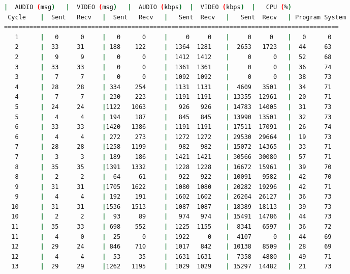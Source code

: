 \begin{adjustbox}{max width=\textwidth}
\begin{lstlisting}[language=bash,basicstyle=\ttfamily\scriptsize]
          |  AUDIO (msg)   |  VIDEO (msg)   |  AUDIO (kbps)  |  VIDEO (kbps)  |   CPU (%)
 Cycle    |  Sent   Recv   |  Sent   Recv   |   Sent  Recv   |   Sent  Recv   | Program System
============================================================================================
   1      |   0      0     |   0      0     |     0     0    |     0     0    |   0      0
   2      |  33     31     | 188    122     |  1364  1281    |  2653   1723   |  44     63
   2      |   9      9     |   0      0     |  1412  1412    |     0      0   |  52     68
   3      |  33     33     |   0      0     |  1361  1361    |     0      0   |  36     74
   3      |   7      7     |   0      0     |  1092  1092    |     0      0   |  38     73
   4      |  28     28     | 334    254     |  1131  1131    |  4609   3501   |  34     71
   4      |   7      7     | 230    223     |  1191  1191    | 13355  12961   |  20     71
   5      |  24     24     |1122   1063     |   926   926    | 14783  14005   |  31     73
   5      |   4      4     | 194    187     |   845   845    | 13990  13501   |  32     73
   6      |  33     33     |1420   1386     |  1191  1191    | 17511  17091   |  26     74
   6      |   4      4     | 272    273     |  1272  1272    | 29530  29664   |  19     73
   7      |  28     28     |1258   1199     |   982   982    | 15072  14365   |  33     71
   7      |   3      3     | 189    186     |  1421  1421    | 30566  30080   |  57     71
   8      |  35     35     |1391   1332     |  1228  1228    | 16672  15961   |  39     70
   8      |   2      2     |  64     61     |   922   922    | 10091   9582   |  42     70
   9      |  31     31     |1705   1622     |  1080  1080    | 20282  19296   |  42     71
   9      |   4      4     | 192    191     |  1602  1602    | 26264  26127   |  36     73
  10      |  31     31     |1536   1513     |  1087  1087    | 18389  18113   |  39     73
  10      |   2      2     |  93     89     |   974   974    | 15491  14786   |  44     73
  11      |  35     33     | 698    552     |  1225  1155    |  8341   6597   |  36     72
  11      |   4      0     |  25      0     |  1922     0    |  4107      0   |  44     69
  12      |  29     24     | 846    710     |  1017   842    | 10138   8509   |  28     69
  12      |   4      4     |  53     35     |  1631  1631    |  7358   4880   |  49     71
  13      |  29     29     |1262   1195     |  1029  1029    | 15297  14482   |  21     73

\end{lstlisting}
\end{adjustbox}
